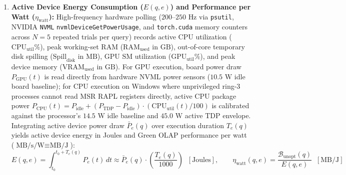 \documentclass[10pt,a4paper]{article}
\begin{document}
\begin{enumerate}[leftmargin=1.5em,itemsep=3pt]
\begin{equation}
    \end{equation}
    \item \textbf{Active Device Energy Consumption ($E(q,e)$) and Performance per Watt ($\eta_{\text{watt}}$):} High-frequency hardware polling ($200\text{--}250\text{ Hz}$ via \texttt{psutil}, NVIDIA \texttt{NVML} \texttt{nvmlDeviceGetPowerUsage}, and \texttt{torch.cuda} memory counters across $N=5$ repeated trials per query) records active CPU utilization ($\text{CPU}_{\text{util}}\%$), peak working-set RAM ($\text{RAM}_{\text{used}}$ in $\text{GB}$), out-of-core temporary disk spilling ($\text{Spill}_{\text{disk}}$ in $\text{MB}$), GPU SM utilization ($\text{GPU}_{\text{util}}\%$), and peak device memory ($\text{VRAM}_{\text{used}}$ in $\text{GB}$). For GPU execution, board power draw $P_{\text{GPU}}(t)$ is read directly from hardware NVML power sensors ($10.5\text{ W}$ idle board baseline); for CPU execution on Windows where unprivileged ring-3 processes cannot read MSR RAPL registers directly, active CPU package power $P_{\text{CPU}}(t) = P_{\text{idle}} + (P_{\text{TDP}} - P_{\text{idle}}) \cdot (\text{CPU}_{\text{util}}(t)/100)$ is calibrated against the processor's $14.5\text{ W}$ idle baseline and $45.0\text{ W}$ active TDP envelope. Integrating active device power draw $\bar{P}_e(q)$ over execution duration $T_e(q)$ yields active device energy in Joules and Green OLAP performance per watt ($\text{MB/s/W} \equiv \text{MB/J}$):
    \begin{equation}
        E(q, e) = \int_{t_0}^{t_0 + T_e(q)} P_e(t)\,dt \approx \bar{P}_e(q) \cdot \left(\frac{T_e(q)}{1000}\right) \;\; [\text{Joules}], \qquad \eta_{\text{watt}}(q, e) = \frac{\mathcal{B}_{\text{unopt}}(q)}{E(q, e)} \;\; [\text{MB/J}]
    \end{equation}
\end{enumerate}
\end{document}
